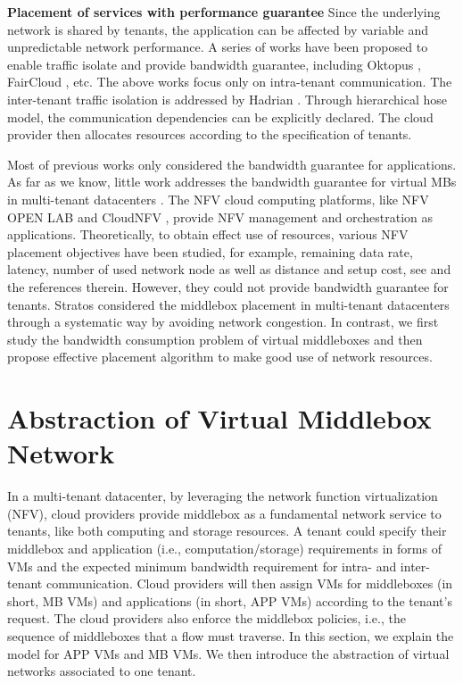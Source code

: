 \documentclass[10pt, conference, letterpaper]{IEEEtran}
\begin{document}
\textbf{Placement of services with performance guarantee}
Since the underlying network is shared by tenants, the application can be affected by variable and unpredictable network performance. A series of works have been proposed to enable traffic isolate and provide bandwidth guarantee, including Oktopus \cite{B11tpd}, FairCloud \cite{P12fst}, etc. The above works focus only on intra-tenant communication. The inter-tenant traffic isolation is addressed by Hadrian \cite{B13cta}. Through hierarchical hose model, the communication dependencies can be explicitly declared. The cloud provider then allocates resources according to the specification of tenants. 

Most of previous works only considered the bandwidth guarantee for applications. As far as we know, little work addresses the bandwidth guarantee for virtual MBs in multi-tenant datacenters \cite{7243304}. The NFV cloud computing platforms, like NFV OPEN LAB \cite{HuaweiNFV} and CloudNFV \cite{CloudNFV}, provide NFV management and orchestration as applications. Theoretically, to obtain effect use of resources, various NFV placement objectives have been studied, for example, remaining data rate, latency, number of used network node as well as distance and setup cost, see \cite{M14sap, cohen2015near} and the references therein. However, they could not provide bandwidth guarantee for tenants. Stratos \cite{stratos12} considered the middlebox placement in multi-tenant datacenters through a systematic way by avoiding network congestion. In contrast, we first study the bandwidth consumption problem of virtual middleboxes and then propose effective placement algorithm to make good use of network resources.

\section{Abstraction of Virtual Middlebox Network}\label{sec:abstraction}
In a multi-tenant datacenter, by leveraging the network function virtualization (NFV), cloud providers provide middlebox as a fundamental network service to tenants, like both computing and storage resources. A tenant could specify their middlebox and application (i.e., computation/storage) requirements in forms of VMs and the expected minimum bandwidth requirement for intra- and inter-tenant communication. Cloud providers will then assign VMs for middleboxes (in short, MB VMs) and applications (in short, APP VMs) according to the tenant's request. The cloud providers also enforce the middlebox policies, i.e., the sequence of middleboxes that a flow must traverse. In this section, we explain the model for APP VMs and MB VMs. We then introduce the abstraction of virtual networks associated to one tenant.
\end{document}
